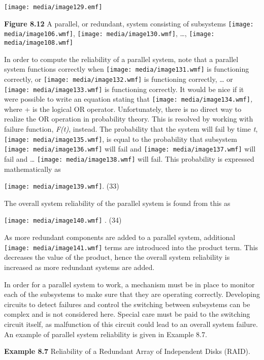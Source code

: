 \texttt{[image: media/image129.emf]}

\textbf{Figure 8.12} A parallel, or redundant, system consisting of
subsystems \texttt{[image: media/image106.wmf]},
\texttt{[image: media/image130.wmf]}, \ldots,
\texttt{[image: media/image108.wmf]}

In order to compute the reliability of a parallel system, note that a
parallel system functions correctly when
\texttt{[image: media/image131.wmf]} is functioning correctly, or
\texttt{[image: media/image132.wmf]} is functioning correctly, \ldots{}
or \texttt{[image: media/image133.wmf]} is functioning correctly. It
would be nice if it were possible to write an equation stating that
\texttt{[image: media/image134.wmf]}\emph{,} where + is the logical OR
operator. Unfortunately, there is no direct way to realize the OR
operation in probability theory. This is resolved by working with
failure function, \emph{F(t)}, instead. The probability that the system
will fail by time \emph{t}, \texttt{[image: media/image135.wmf]}, is
equal to the probability that subsystem
\texttt{[image: media/image136.wmf]} will fail and
\texttt{[image: media/image137.wmf]} will fail and \ldots{}
\texttt{[image: media/image138.wmf]} will fail. This probability is
expressed mathematically as

\texttt{[image: media/image139.wmf]}.
(33)

The overall system reliability of the parallel system is found from this
as

\texttt{[image: media/image140.wmf]} . (34)

As more redundant components are added to a parallel system, additional
\texttt{[image: media/image141.wmf]} terms are introduced into the
product term. This decreases the value of the product, hence the overall
system reliability is increased as more redundant systems are added.

In order for a parallel system to work, a mechanism must be in place to
monitor each of the subsystems to make sure that they are operating
correctly. Developing circuits to detect failures and control the
switching between subsystems can be complex and is not considered here.
Special care must be paid to the switching circuit itself, as
malfunction of this circuit could lead to an overall system failure. An
example of parallel system reliability is given in Example 8.7.

\textbf{Example 8.7} Reliability of a Redundant Array of Independent
Disks (RAID).

